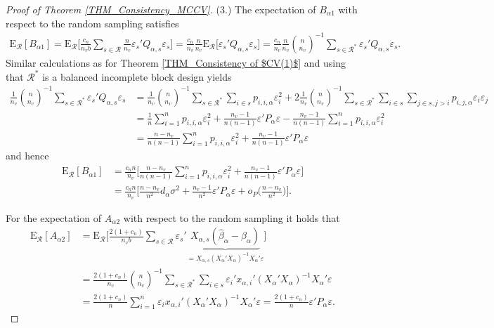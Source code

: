 \documentclass[Research_Module_ES.tex]{subfiles}
\begin{document}
\begin{proof}[Proof of Theorem \ref{THM_Consistency_MCCV}]
	(3.)
	The expectation of $B_{\alpha1}$ with respect to the random sampling satisfies
	\begin{align*}
	\mathrm{E}_\mathcal{R}[B_{\alpha1}]= \mathrm{E}_\mathcal{R}\biggl[ \frac{c_n}{n_vb}\sum_{s\in\mathcal{R}}\frac{n}{n_v}\varepsilon_s'Q_{\alpha,s}\varepsilon_s\biggr]
	=\frac{c_n}{n_v} \frac{n}{n_v} \mathrm{E}_\mathcal{R}\bigl[\varepsilon_s'Q_{\alpha,s}\varepsilon_s\bigr]
	= \frac{c_n}{n_v} \frac{n}{n_v}\binom{n}{n_v}^{-1}\sum_{s\in \mathcal{R}^\ast}\varepsilon_s'Q_{\alpha,s}\varepsilon_s.
	\end{align*}
	Similar calculations as for Theorem \ref{THM_Consistency of $CV(1)$} and using that $\mathcal{R}^\ast$ is a balanced incomplete block design yields 
	\begin{align*}
	\frac{1}{n_v}\binom{n}{n_v}^{-1}\sum_{s\in \mathcal{R}^\ast}\varepsilon_s'Q_{\alpha,s}\varepsilon_s 
	&= \frac{1}{n_v}\binom{n}{n_v}^{-1}\sum_{s\in \mathcal{R}^\ast} \sum_{i\in s} p_{i,i,\alpha}\varepsilon_i^2 
	+ 2\frac{1}{n_v}\binom{n}{n_v}^{-1}\sum_{s\in \mathcal{R}^\ast} \sum_{i\in s} \sum_{j\in s, j>i} p_{i,j,\alpha}\varepsilon_i\varepsilon_j \\
	&= \frac{1}{n}\sum_{i=1}^n p_{i,i,\alpha}\varepsilon_i^2 + \frac{n_v-1}{n(n-1)}\varepsilon'P_\alpha\varepsilon - \frac{n_v-1}{n(n-1)}\sum_{i=1}^n p_{i,i,\alpha}\varepsilon_i^2\\
	&=\frac{n-n_v}{n(n-1)}\sum_{i=1}^n p_{i,i,\alpha}\varepsilon_i^2
	+\frac{n_v-1}{n(n-1)}\varepsilon'P_\alpha\varepsilon
	\end{align*}
	and hence
	\begin{align*}
	\mathrm{E}_\mathcal{R}[B_{\alpha1}]
	&=\frac{c_nn}{n_v}\biggl[\frac{n-n_v}{n(n-1)}\sum_{i=1}^n p_{i,i,\alpha}\varepsilon_i^2
	+\frac{n_v-1}{n(n-1)}\varepsilon'P_\alpha\varepsilon\biggr]\\
	&=\frac{c_nn}{n_v}\biggl[\frac{n-n_v}{n^2}d_\alpha\sigma^2
	+\frac{n_v-1}{n^2}\varepsilon'P_\alpha\varepsilon + o_P\biggl(\frac{n-n_v}{n^2}\biggr)\biggr].
	\end{align*}
	
	For the expectation of $A_{\alpha2}$ with respect to the random sampling it holds that
	\begin{align*}
	\mathrm{E}_\mathcal{R}[A_{\alpha2}] 
	&=\mathrm{E}_\mathcal{R}\biggl[ \frac{2(1+c_n)}{n_vb}\sum_{s\in \mathcal{R}}\varepsilon_s'\underbrace{X_{\alpha,s}(\hat{\beta}_\alpha-\beta_\alpha)}_{=X_{\alpha,s}(X_\alpha'X_\alpha)^{-1}X_\alpha'\varepsilon}\biggr]\\
	&= \frac{2(1+c_n)}{n_v}\binom{n}{n_v}^{-1}\sum_{s\in\mathcal{R}^\ast}\sum_{i\in s}\varepsilon_i'x_{\alpha,i}'(X_\alpha'X_\alpha)^{-1}X_\alpha'\varepsilon\\
	&= \frac{2(1+c_n)}{n} \sum_{i=1}^n\varepsilon_ix_{\alpha,i}'(X_\alpha'X_\alpha)^{-1}X_\alpha'\varepsilon
	= \frac{2(1+c_n)}{n} \varepsilon'P_\alpha\varepsilon.
	\end{align*}
	

\end{proof}
\end{document}
